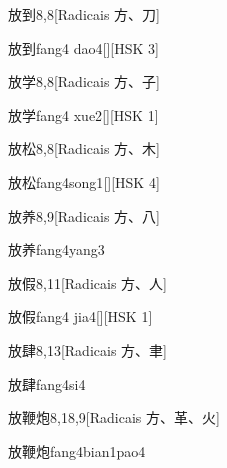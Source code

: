 \begin{entry}{放到}{8,8}[Radicais ⽅、⼑]
  \begin{phonetics}{放到}{fang4 dao4}[][HSK 3]
  \end{phonetics}
\end{entry}

\begin{entry}{放学}{8,8}[Radicais ⽅、⼦]
  \begin{phonetics}{放学}{fang4 xue2}[][HSK 1]
  \end{phonetics}
\end{entry}

\begin{entry}{放松}{8,8}[Radicais ⽅、⽊]
  \begin{phonetics}{放松}{fang4song1}[][HSK 4]
  \end{phonetics}
\end{entry}

\begin{entry}{放养}{8,9}[Radicais ⽅、⼋]
  \begin{phonetics}{放养}{fang4yang3}
  \end{phonetics}
\end{entry}

\begin{entry}{放假}{8,11}[Radicais ⽅、⼈]
  \begin{phonetics}{放假}{fang4 jia4}[][HSK 1]
  \end{phonetics}
\end{entry}

\begin{entry}{放肆}{8,13}[Radicais ⽅、⾀]
  \begin{phonetics}{放肆}{fang4si4}
  \end{phonetics}
\end{entry}

\begin{entry}{放鞭炮}{8,18,9}[Radicais ⽅、⾰、⽕]
  \begin{phonetics}{放鞭炮}{fang4bian1pao4}
  \end{phonetics}
\end{entry}

